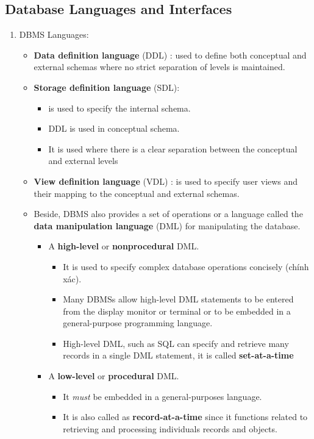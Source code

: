 \documentclass[10pt]{article}
\newcommand{\tf}{\textbf}
\newcommand{\ti}{\textit}
\begin{document}
\subsection{Database Languages and Interfaces}
\begin{enumerate}
	\item DBMS Languages:
	\begin{itemize}
		\item \tf{Data definition language} (DDL) : used to define both conceptual and external schemas where no strict separation of levels is maintained.
		\item \tf{Storage definition language} (SDL):
		\begin{itemize}
			\item is used to specify the internal schema.
			\item DDL is used in conceptual schema.
			\item It is used where there is a clear separation between the conceptual and external levels
		\end{itemize}  
		\item \tf{View definition language} (VDL) : is used to specify user views and their mapping to the conceptual and external schemas.
		\item Beside, DBMS also provides a set of operations or a language called the \tf{data manipulation language} (DML) for manipulating the database. \\

		\begin{itemize}
			\item A \tf{high-level} or \tf{nonprocedural} DML.
			\begin{itemize}
				\item It is used to specify complex database operations concisely (chính xác).
				\item Many DBMSs allow high-level DML statements to be entered from the display monitor or terminal or to be embedded in a general-purpose programming language.
				\item High-level DML, such as SQL can specify and retrieve many records in a single DML statement, it is called \tf{set-at-a-time} 
			\end{itemize}
			\item A \tf{low-level} or \tf{procedural} DML.
			\begin{itemize}
				\item It \ti{must} be embedded in a general-purposes language.
				\item It is also called as \tf{record-at-a-time} since it functions related to retrieving and processing individuals records and objects.
			\end{itemize}
		\end{itemize}


\end{itemize}
\end{enumerate}
\end{document}
